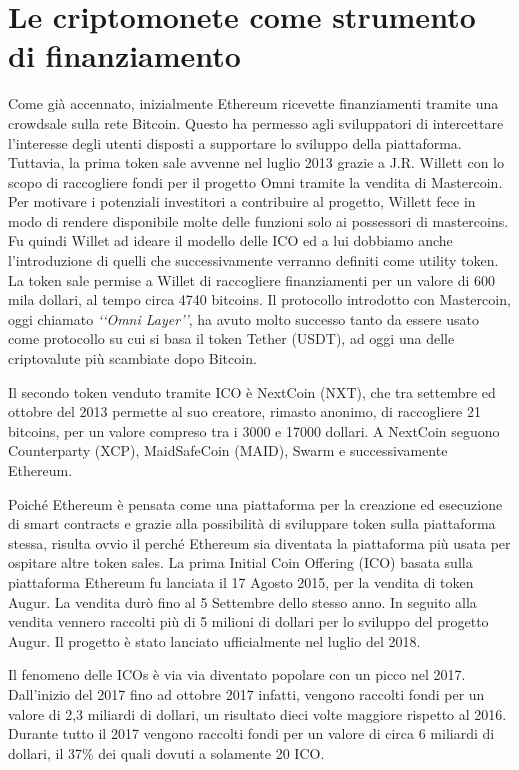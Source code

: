 \section{Le criptomonete come strumento di finanziamento}
Come già accennato, inizialmente Ethereum ricevette finanziamenti tramite una crowdsale sulla rete Bitcoin.  Questo ha permesso agli sviluppatori di intercettare l'interesse degli utenti disposti a supportare lo sviluppo della piattaforma. Tuttavia, la prima token sale avvenne nel luglio 2013 grazie a J.R. Willett con lo scopo di raccogliere fondi per il progetto Omni tramite la vendita di Mastercoin\cite{K23}. Per motivare i potenziali investitori a contribuire al progetto, Willett fece in modo di rendere disponibile molte delle funzioni solo ai possessori di mastercoins. Fu quindi Willet ad ideare il modello delle ICO ed a lui dobbiamo anche l'introduzione di quelli che successivamente verranno definiti come utility token. La token sale permise a Willet di raccogliere finanziamenti per un valore di 600 mila dollari, al tempo circa 4740 bitcoins. Il protocollo introdotto con Mastercoin, oggi chiamato \textit{‘‘Omni Layer’’}, ha avuto molto successo tanto da essere usato come protocollo su cui si basa il token Tether (USDT), ad oggi una delle criptovalute più scambiate dopo Bitcoin\cite{K24}. 

Il secondo token venduto tramite ICO è NextCoin (NXT), che tra settembre ed ottobre del 2013 permette al suo creatore, rimasto anonimo, di raccogliere 21 bitcoins, per un valore compreso tra i 3000 e 17000 dollari. A NextCoin seguono Counterparty (XCP), MaidSafeCoin (MAID), Swarm e successivamente Ethereum.\cite{K25,K26,K27,K28}

Poiché Ethereum è pensata come una piattaforma per la creazione ed esecuzione di smart contracts e grazie alla possibilità di sviluppare token sulla piattaforma stessa, risulta ovvio il perché Ethereum sia diventata la piattaforma più usata per ospitare altre token sales. La prima Initial Coin Offering (ICO) basata sulla piattaforma Ethereum fu lanciata il 17 Agosto 2015, per la vendita di token Augur\cite{K29}. La vendita durò fino al 5 Settembre dello stesso anno. In seguito alla vendita vennero raccolti più di 5 milioni di dollari per lo sviluppo del progetto Augur. Il progetto è stato lanciato ufficialmente nel luglio del 2018. 

Il fenomeno delle ICOs è via via diventato popolare con un picco nel 2017. Dall'inizio  del 2017 fino ad ottobre 2017 infatti, vengono raccolti fondi per un valore di 2,3 miliardi di dollari, un risultato dieci volte maggiore rispetto al 2016. 
Durante tutto il 2017 vengono raccolti fondi per un valore di circa 6 miliardi di dollari, il 37\% dei quali dovuti a solamente 20 ICO. 

